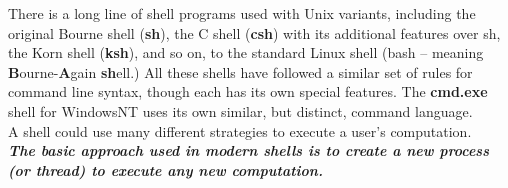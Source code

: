 \documentclass{article}
\begin{document}
There is a long line of shell programs used with Unix variants, including the original Bourne shell (\textbf{sh}), the C shell (\textbf{csh}) with its additional features over sh, the Korn shell (\textbf{ksh}), and so on, to the standard Linux shell (bash -- meaning \textbf{B}ourne-\textbf{A}gain \textbf{sh}ell.) All these shells have followed a similar set of rules for command line syntax, though each has its own special features.  The \textbf{cmd.exe} shell for WindowsNT uses its own similar, but distinct, command language.
\\
A shell could use many different strategies to execute a user's computation. \\ \textit{\textbf {The basic approach used in modern shells is to create a new process (or thread) to execute any new computation.}}
\end{document}
